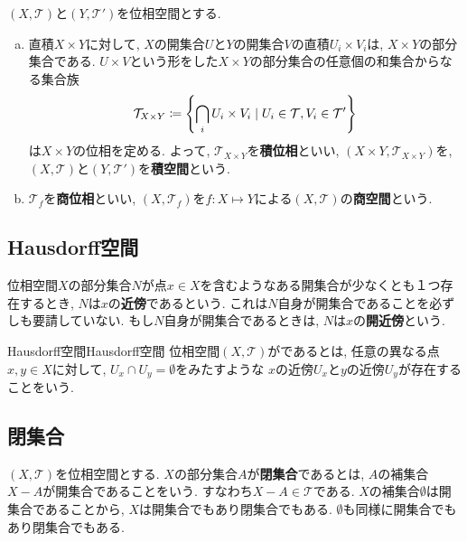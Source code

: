 \documentclass[../main.tex]{subfiles}
\begin{document}
        \begin{exm}{}{}
            $(X,\mathcal{T})$と$(Y,\mathcal{T}')$を位相空間とする.
            \begin{enumerate}[(a)]
                \item 直積$X \times Y$に対して, $X$の開集合$U$と$Y$の開集合$V$の直積$U_i \times V_i$は, $X \times Y$の部分集合である.
                        $U \times V$という形をした$X \times Y$の部分集合の任意個の和集合からなる集合族
                        \begin{equation*}
                            \mathcal{T}_{X \times Y} \coloneqq \qty{\bigcap_i U_i \times V_i \mid U_i\in\mathcal{T},V_i\in\mathcal{T}'}
                        \end{equation*}
                        は$X \times Y$の位相を定める.
                        よって, $\mathcal{T}_{X \times Y}$を\textbf{積位相}といい, $(X \times Y,\mathcal{T}_{X \times Y})$を,
                        $(X,\mathcal{T})$と$(Y,\mathcal{T}')$を\textbf{積空間}という.
                \item $\mathcal{T}_f$を\textbf{商位相}といい, $(X,\mathcal{T}_f)$を$f:X \mapsto Y$による$(X,\mathcal{T})$の\textbf{商空間}という.
            \end{enumerate}
        \end{exm}
    \subsection{Hausdorff空間}
        位相空間$X$の部分集合$N$が点$x \in X$を含むようなある開集合が少なくとも１つ存在するとき, $N$は$x$の\textbf{近傍}であるという. これは$N$自身が開集合であることを必ずしも要請していない. もし$N$自身が開集合であるときは, $N$は$x$の\textbf{開近傍}という.
        \begin{dfn}{Hausdorff空間}{Hausdorff空間}
            位相空間$(X,\mathcal{T})$がであるとは, 任意の異なる点$x,y \in X$に対して, $U_x \cap U_y = \emptyset$をみたすような $x$の近傍$U_x$と$y$の近傍$U_y$が存在することをいう.
        \end{dfn}

    \subsection{閉集合}
        $(X,\mathcal{T})$を位相空間とする. $X$の部分集合$A$が\textbf{閉集合}であるとは, $A$の補集合$X-A$が開集合であることをいう. すなわち$X-A\in\mathcal{T}$である. $X$の補集合$\emptyset$は開集合であることから, $X$は開集合でもあり閉集合でもある. $\emptyset$も同様に開集合でもあり閉集合でもある.
\end{document}
